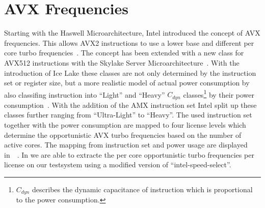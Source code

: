 \section{AVX Frequencies}
\label{sec:avx-frequencies}

Starting with the Haswell Microarchitecture, Intel introduced the concept of AVX frequencies.
This allows AVX2 instructions to use a lower base and different per core turbo frequencies~\cite{Hackenberg_2015_Haswell}.
The concept has been extended with a new class for AVX512 instructions with the Skylake Server Microarchitecture~\cite[Sec. 2.6.3]{Intel_Optimization_Reference_Manual_050}.
With the introduction of Ice Lake these classes are not only determined by the instruction set or register size, but a more realistic model of actual power consumption by also classifing instruction into ``Light'' and ``Heavy'' $C_{dyn}$ classes\footnote{$C_{dyn}$ describes the dynamic capacitance of instruction which is proportional to the power consumption.} by their power consumption~\cite{papazian_new_2020}.
With the addition of the AMX instruction set Intel split up these classes further ranging from ``Ultra-Light'' to ``Heavy''.
The used instruction set together with the power consumption are mapped to four license levels which determine the opportunistic AVX turbo frequencies based on the number of active cores.
The mapping from instruction set and power usage are displayed in~~\cite{ServeTheHome_Emerald_Rapids_2023}.
In  we are able to extracte the per core opportunistic turbo frequencies per license on our testsystem using a modified version of ``intel-speed-select''.


